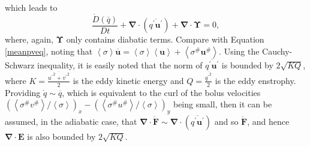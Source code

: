 \documentclass[10pt,a4paper]{article}
\newcommand*\thkmean[1]{\overline{#1}}
\newcommand*\thkres[1]{{#1}^{\prime}}
\newcommand*\nthkmean[1]{\left\langle{#1}\right\rangle}
\newcommand*\nthkres[1]{{#1}^{\#}}
\newcommand*\spec[1]{\mathring{#1}}
\begin{document}
                      which leads  to
                      \begin{equation}
                      \frac{\spec{D} \left( \thkmean{q}\right)}{D t}
                      + \boldsymbol{\nabla}\cdot\left(\thkmean{\thkres{q} \thkres{\boldsymbol{u}}}\right)
                      +\boldsymbol{\nabla}\cdot\boldsymbol{\Upsilon}=0 ,
                      \end{equation}
                      where, again, $\boldsymbol{\Upsilon}$ only contains
                      diabatic terms. Compare with Equation \ref{meanpveq}, noting that
                       ${\nthkmean{\sigma}\thkmean{\boldsymbol{u}}=\nthkmean{\sigma}\nthkmean{\boldsymbol{u}} + \nthkmean{\nthkres{\sigma}\nthkres{\boldsymbol{u}}}}$.
                       Using the Cauchy-Schwarz inequality, it is easily noted that
                       the norm of $\thkmean{\thkres{q} \thkres{\boldsymbol{u}}}$ is bounded
                       by $2\sqrt{KQ}$, where $K = \frac{\thkmean{{\thkres{u}}^{2} +
                       	{\thkres{v}}^{2}}}{2}$ is the eddy kinetic energy and $Q =
                        \frac{\thkmean{{\thkres{q}}^{2}}}{2}$ is the eddy enstrophy.
                       Providing $\spec{q} \sim \thkmean{q}$, which is equivalent 
                       to the  curl of the bolus velocities $\left(\nthkmean{\nthkres{\sigma}\nthkres{v}}/\nthkmean{\sigma}\right)_{x}-\left(\nthkmean{\nthkres{\sigma}\nthkres{u}}/\nthkmean{\sigma}\right)_{y}$ 
                       being small, then it can be assumed, in the adiabatic case,
                       that $\boldsymbol{\nabla}\cdot\spec{\boldsymbol{F}} \sim \boldsymbol{\nabla}\cdot\left(\thkmean{\thkres{q} \thkres{\boldsymbol{u}}}\right)$ and so $\spec{\boldsymbol{F}}$,
                       and hence $\boldsymbol{\nabla}\cdot\boldsymbol{E}$
                       is also bounded by  $2\sqrt{KQ}$.
                       
                       
                      
                      
                      
                      
                     
\end{document}
